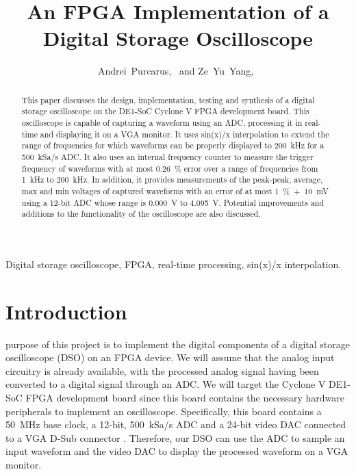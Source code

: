 \documentclass[journal,hidelinks]{IEEEtran}
\title{An FPGA Implementation of a \\ Digital Storage Oscilloscope}
\author{Andrei~Purcarus,~\IEEEmembership{McGill~University} and Ze~Yu~Yang,~\IEEEmembership{McGill~University}}
\begin{document}
\sloppy

\maketitle

\begin{abstract}

This paper discusses the design, implementation, testing and synthesis of a digital storage oscilloscope on the DE1-SoC Cyclone V FPGA development board. This oscilloscope is capable of capturing a waveform using an ADC, processing it in real-time and displaying it on a VGA monitor. It uses sin(x)/x interpolation to extend the range of frequencies for which waveforms can be properly displayed to 200~kHz for a 500~kSa/s ADC. It also uses an internal frequency counter to measure the trigger frequency of waveforms with at most 0.26~\% error over a range of frequencies from 1~kHz to 200~kHz. In addition, it provides measurements of the peak-peak, average, max and min voltages of captured waveforms with an error of at most 1~\%~+~10~mV using a 12-bit ADC whose range is 0.000~V to 4.095~V. Potential improvements and additions to the functionality of the oscilloscope are also discussed.

\end{abstract}

\begin{IEEEkeywords}

Digital storage oscilloscope, FPGA, real-time processing, sin(x)/x interpolation.

\end{IEEEkeywords}

\section{Introduction}

 purpose of this project is to implement the digital components of a digital storage oscilloscope (DSO) on an FPGA device. We will assume that the analog input circuitry is already available, with the processed analog signal having been converted to a digital signal through an ADC. We will target the Cyclone V DE1-SoC FPGA development board since this board contains the necessary hardware peripherals to implement an oscilloscope. Specifically, this board contains a 50~MHz base clock, a 12-bit, 500~kSa/s ADC and a 24-bit video DAC connected to a VGA D-Sub connector \cite{DE1SoC,ltc2308}. Therefore, our DSO can use the ADC to sample an input waveform and the video DAC to display the processed waveform on a VGA monitor.
\end{document}
